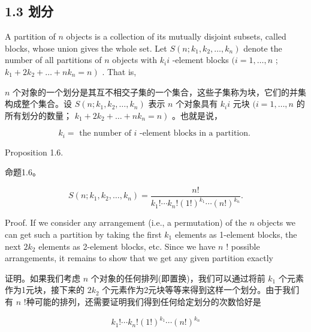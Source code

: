\documentclass[10pt]{article}
\begin{document}
\begin{tcolorbox}\relax
\section*{1.3 划分}
\end{tcolorbox}

A partition of \(n\) objects is a collection of its mutually disjoint subsets, called blocks, whose union gives the whole set. Let \(S\left( {n;{k}_{1},{k}_{2},\ldots ,{k}_{n}}\right)\) denote the number of all partitions of \(n\) objects with \({k}_{i}i\) -element blocks \((i = 1,\ldots ,n\) ; \(\left. {{k}_{1} + 2{k}_{2} + \ldots  + n{k}_{n} = n}\right)\) . That is,

\begin{tcolorbox}\relax
\(n\) 个对象的一个划分是其互不相交子集的一个集合，这些子集称为块，它们的并集构成整个集合。设 \(S\left( {n;{k}_{1},{k}_{2},\ldots ,{k}_{n}}\right)\) 表示 \(n\) 个对象具有 \({k}_{i}i\) 元块 \((i = 1,\ldots ,n\) 的所有划分的数量； \(\left. {{k}_{1} + 2{k}_{2} + \ldots  + n{k}_{n} = n}\right)\) 。也就是说，
\end{tcolorbox}

\[
{k}_{i} = \text{ the number of }i\text{ -element blocks in a partition. }
\]

Proposition 1.6.

\begin{tcolorbox}\relax
命题1.6。
\end{tcolorbox}

\[
S\left( {n;{k}_{1},{k}_{2},\ldots ,{k}_{n}}\right)  = \frac{n!}{{k}_{1}!\cdots {k}_{n}!{\left( 1!\right) }^{{k}_{1}}\cdots {\left( n!\right) }^{{k}_{n}}}.
\]

Proof. If we consider any arrangement (i.e., a permutation) of the \(n\) objects we can get such a partition by taking the first \({k}_{1}\) elements as 1-element blocks, the next \(2{k}_{2}\) elements as 2-element blocks, etc. Since we have \(n\) ! possible arrangements, it remains to show that we get any given partition exactly

\begin{tcolorbox}\relax
证明。如果我们考虑 \(n\) 个对象的任何排列(即置换)，我们可以通过将前 \({k}_{1}\) 个元素作为1元块，接下来的 \(2{k}_{2}\) 个元素作为2元块等等来得到这样一个划分。由于我们有 \(n\) !种可能的排列，还需要证明我们得到任何给定划分的次数恰好是
\end{tcolorbox}

\[
{k}_{1}!\cdots {k}_{n}!{\left( 1!\right) }^{{k}_{1}}\cdots {\left( n!\right) }^{{k}_{n}}
\]
\end{document}
